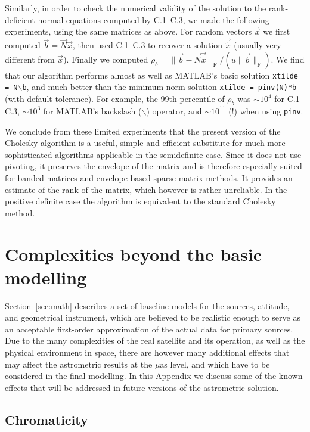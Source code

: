 \documentclass[structabstract]{aa}
\begin{document}
Similarly, in order to check the numerical validity of the solution to
the rank-deficient normal equations computed by C.1--C.3, we made
the following experiments, using the same matrices as above. For 
random vectors $\vec{x}$ we first computed $\vec{b}=\vec{N}\vec{x}$, 
then used C.1--C.3 to recover a solution $\vec{\tilde{x}}$ (usually very
different from $\vec{x}$). Finally we computed
$\rho_b=\|\vec{b}-\vec{N}\vec{\tilde{x}}\|_\text{F}/(u\|\vec{b}\|_\text{F})$.
We find that our algorithm performs almost as well as MATLAB's 
basic solution {\tt xtilde = N$\backslash$b}, and much better than 
the minimum norm solution {\tt xtilde = pinv(N)*b} (with default tolerance). 
For example, the
99th percentile of $\rho_b$ was $\sim\!\!10^4$ for C.1--C.3, 
$\sim\!\!10^3$ for MATLAB's backslash ($\backslash$) operator, and
$\sim\!\!10^{11}$ (!) when using {\tt pinv}.

We conclude from these limited experiments
that the present version of the Cholesky algorithm is a useful,
simple and efficient substitute for much more sophisticated algorithms 
applicable in the semidefinite case. Since it does not use pivoting, it
preserves the envelope of the matrix and is therefore especially suited
for banded matrices and envelope-based sparse matrix methods. 
It provides an estimate of the rank of the matrix, which 
however is rather unreliable. In the positive definite case the algorithm
is equivalent to the standard Cholesky method.


\section{Complexities beyond the basic modelling} \label{sec:complexities}

Section~\ref{sec:math} describes a set of baseline models for the sources,
attitude, and geometrical instrument, which are believed to be realistic enough 
to serve as an acceptable first-order approximation of the actual data for primary 
sources. Due to the many complexities of the
real satellite and its operation, as well as the physical environment in space, there 
are however many additional effects that may affect the astrometric results at
the $\mu$as level, and which have to be considered in the final modelling. 
In this Appendix we discuss some of the known effects that will be 
addressed in future versions of the astrometric solution. 


\subsection{Chromaticity}\label{sec:chrom}
\end{document}
